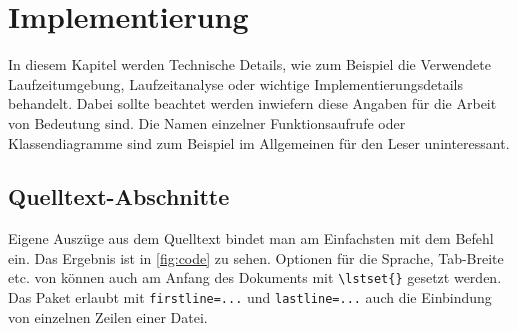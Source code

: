 \chapter{Implementierung}
\label{ch:implementierung}

In diesem Kapitel werden Technische Details, wie zum Beispiel die Verwendete Laufzeitumgebung, Laufzeitanalyse oder wichtige Implementierungsdetails behandelt.
Dabei sollte beachtet werden inwiefern diese Angaben für die Arbeit von Bedeutung sind. Die Namen einzelner Funktionsaufrufe oder Klassendiagramme sind zum Beispiel im Allgemeinen für den Leser uninteressant.

\section{Quelltext-Abschnitte}
Eigene Auszüge aus dem Quelltext bindet man am Einfachsten mit dem Befehl \verb++ ein. Das Ergebnis ist in \ref{fig:code} zu sehen.
Optionen für die Sprache, Tab-Breite etc. von \verb++ können auch am Anfang des Dokuments mit \verb+\lstset{}+ gesetzt werden.
Das Paket erlaubt mit \verb+firstline=...+ und \verb+lastline=...+ auch die Einbindung von einzelnen Zeilen einer Datei.


\label{fig:code}


